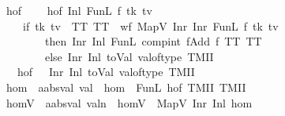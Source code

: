 \begin{isabellebody}
\isamarkupfalse%
\ hof\ \ \isanewline
\ \ {\isachardoublequoteopen}hof\ {\isacharparenleft}{\kern0pt}Inl\ {\isacharparenleft}{\kern0pt}FunL\ f\ tk\ tv{\isacharparenright}{\kern0pt}{\isacharparenright}{\kern0pt}\ {\isacharequal}{\kern0pt}\isanewline
\ \ \ \ {\isacharparenleft}{\kern0pt}if\ {\isacharparenleft}{\kern0pt}tk{\isacharcomma}{\kern0pt}\ tv{\isacharparenright}{\kern0pt}\ {\isacharequal}{\kern0pt}\ {\isacharparenleft}{\kern0pt}TT{\isacharcomma}{\kern0pt}\ TT{\isacharparenright}{\kern0pt}\ {\isasymand}\ wf\ {\isacharparenleft}{\kern0pt}MapV\ {\isacharparenleft}{\kern0pt}Inr\ {\isacharparenleft}{\kern0pt}Inr\ {\isacharparenleft}{\kern0pt}FunL\ f\ tk\ tv{\isacharparenright}{\kern0pt}{\isacharparenright}{\kern0pt}{\isacharparenright}{\kern0pt}{\isacharparenright}{\kern0pt}\isanewline
\ \ \ \ \ \ \ \ then\ Inr\ {\isacharparenleft}{\kern0pt}Inl\ {\isacharparenleft}{\kern0pt}FunL\ {\isacharparenleft}{\kern0pt}compint\ fAdd{}\ f{\isacharparenright}{\kern0pt}\ TT\ TT{\isacharparenright}{\kern0pt}{\isacharparenright}{\kern0pt}\isanewline
\ \ \ \ \ \ \ \ else\ Inr\ {\isacharparenleft}{\kern0pt}Inl\ {\isacharparenleft}{\kern0pt}toVal{}\ {\isacharparenleft}{\kern0pt}val{\isacharunderscore}{\kern0pt}of{\isacharunderscore}{\kern0pt}type\ {\isacharparenleft}{\kern0pt}TMII{\isacharparenright}{\kern0pt}{\isacharparenright}{\kern0pt}{\isacharparenright}{\kern0pt}{\isacharparenright}{\kern0pt}{\isacharparenright}{\kern0pt}{\isachardoublequoteclose}\isanewline
\ \ {\isacharbar}{\kern0pt}\ {\isachardoublequoteopen}hof\ {\isacharunderscore}{\kern0pt}\ {\isacharequal}{\kern0pt}\ Inr\ {\isacharparenleft}{\kern0pt}Inl\ {\isacharparenleft}{\kern0pt}toVal{}\ {\isacharparenleft}{\kern0pt}val{\isacharunderscore}{\kern0pt}of{\isacharunderscore}{\kern0pt}type\ {\isacharparenleft}{\kern0pt}TMII{\isacharparenright}{\kern0pt}{\isacharparenright}{\kern0pt}{\isacharparenright}{\kern0pt}{\isacharparenright}{\kern0pt}{\isachardoublequoteclose}\isanewline
{}\isamarkupfalse%
\ hom\ {\isacharcolon}{\kern0pt}{\isacharcolon}{\kern0pt}\ {\isachardoublequoteopen}{\isacharprime}{\kern0pt}a{\isacharcolon}{\kern0pt}{\isacharcolon}{\kern0pt}absval\ val{}{\isachardoublequoteclose}\ \ {\isachardoublequoteopen}hom\ {\isasymequiv}\ FunL\ hof\ TMII\ TMII{\isachardoublequoteclose}\isanewline
{}\isamarkupfalse%
\ homV\ {\isacharcolon}{\kern0pt}{\isacharcolon}{\kern0pt}\ {\isachardoublequoteopen}{\isacharprime}{\kern0pt}a{\isacharcolon}{\kern0pt}{\isacharcolon}{\kern0pt}absval\ valn{\isachardoublequoteclose}\ \ {\isachardoublequoteopen}homV\ {\isasymequiv}\ MapV\ {\isacharparenleft}{\kern0pt}Inr\ {\isacharparenleft}{\kern0pt}Inl\ hom{\isacharparenright}{\kern0pt}{\isacharparenright}{\kern0pt}{\isachardoublequoteclose}\isanewline

\end{isabellebody}
